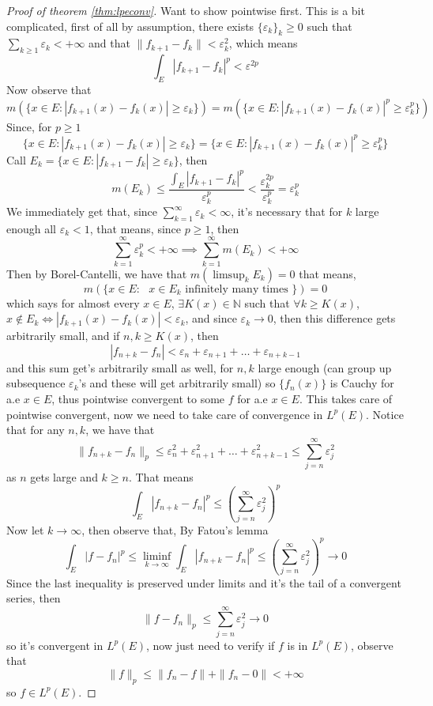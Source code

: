 \documentclass[12pt]{article}
\theoremstyle{definition}
\begin{document}
	\begin{proof}[Proof of theorem \ref{thm:lpeconv}]
		Want to show pointwise first. This is a bit complicated, first of all by assumption, there exists $\{\varepsilon_k \}_k \geq 0 $ such that $\sum_{k \geq 1} \varepsilon_k < +\infty$ and that $\|f_{k+1} - f_k\| < \varepsilon_k^2$, which means 
		$$ 
		\int_{E} |f_{k+1} - f_k|^p < \varepsilon^{2p}
		$$
		Now observe that
		$$ m ( \{ x\in  E \colon |f_{k+1}(x)-f_k(x)| \geq \varepsilon_k \}) = m ( \{x \in E \colon |f_{k+1}(x)-f_k(x)|^p \geq \varepsilon_k^p\})
		$$ Since, for $p \geq 1$ 
		$$
		\{ x\in  E \colon |f_{k+1}(x)-f_k(x)| \geq \varepsilon_k \} =  \{x \in E \colon |f_{k+1}(x)-f_k(x)|^p \geq \varepsilon_k^p\}
		$$
		Call $E_k = \{ x\in  E \colon |f_{k+1}-f_k| \geq \varepsilon_k \}$, then 
		$$ m(E_k ) \leq \frac{\int_{E} |f_{k+1} - f_k|^p}{\varepsilon_k^p} < \frac{\varepsilon_k^{2p}}{\varepsilon_k^p} = \varepsilon_k^p$$
		We immediately get that, since $\sum_{k=1}^\infty \varepsilon_k < \infty$, it's necessary that for $k$ large enough all $\varepsilon_k < 1$, that means, since $p \geq 1$, then 
		$$
		\sum_{k=1}^\infty \varepsilon_k^p < +\infty \implies \sum_{k=1}^\infty m(E_k) < +\infty
		$$
		Then by Borel-Cantelli, we have that $m(\limsup_{k} E_k) = 0$ that means, 
		$$m(\{x \in E \colon \text{ $x \in E_k$ infinitely many times }\}) =0$$
		which says for almost every $x \in E$, $\exists K(x) \in \mathbb{N}$ such that $\forall k \geq K(x)$, $x \notin E_k \iff |f_{k+1}(x) - f_k(x)| < \varepsilon_k$, and since $\varepsilon_k \to 0$, then this difference gets arbitrarily small, and if $n,k \geq K(x)$, then 
		$$|f_{n+k} - f_n| < \varepsilon_n + \varepsilon_{n+1} + \ldots + \varepsilon_{n +k -1}$$
		and this sum get's arbitrarily small as well, for $n,k$ large enough (can group up subsequence $\varepsilon_k$'s and these will get arbitrarily small) so $\{f_n(x)\}$ is Cauchy for a.e $x \in E$, thus pointwise convergent to some $f$ for a.e $x \in E$. This takes care of pointwise convergent, now we need to take care of convergence in $L^p(E)$.
		Notice that for any $n,k$, we have that 
		$$\|f_{n+k} - f_n\|_p \leq \varepsilon_n^2 + \varepsilon_{n+1}^2 + \ldots + \varepsilon_{n+k-1}^2 \leq \sum_{j=n}^\infty \varepsilon_j^2 $$
		as $n$ gets large and $k\geq n$. That means
		$$ \int_{E} |f_{n+k} - f_n|^p \leq \left(\sum_{j=n}^\infty \varepsilon_j^2\right)^p $$
		Now let $k \to \infty$, then observe that, By Fatou's lemma
		$$ \int_{E} |f - f_n|^p  \leq \liminf_{k \to \infty} \int_{E} |f_{n+k} - f_n|^p \leq \left(\sum_{j=n}^\infty \varepsilon_j^2\right)^p \to 0
		$$
		Since the last inequality is preserved under limits and it's the tail of a convergent series, then 
		$$
		\|f - f_n\|_p \leq \sum_{j=n}^\infty \varepsilon_j^2 \to 0
		$$
		so it's convergent in $L^p(E)$, now just need to verify if $f$ is in $L^p(E)$, observe that 
		$$\|f\|_p \leq \|f_n - f\| + \|f_n -0\| < +\infty$$
		so $f \in L^p(E)$.

	\end{proof}
\end{document}

